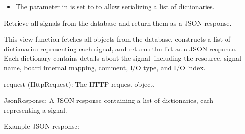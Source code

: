 \documentclass[letterpaper,10pt,english]{sphinxmanual}
\begin{document}
\begin{fulllineitems}
\begin{description}
\begin{itemize}
\item {} 
\sphinxAtStartPar
The  parameter in  is set to  to allow serializing a list of dictionaries.

\end{itemize}

\end{description}

\end{fulllineitems}


\begin{fulllineitems}
\label{\detokenize{app:app.views.get_signals}}
\pysigstartsignatures
{}
\pysigstopsignatures
\sphinxAtStartPar
Retrieve all signals from the database and return them as a JSON response.

\sphinxAtStartPar
This view function fetches all  objects from the database, 
constructs a list of dictionaries representing each signal, and returns the list 
as a JSON response. Each dictionary contains details about the signal, including 
the resource, signal name, board internal mapping, comment, I/O type, and I/O index.
\begin{description}
\sphinxAtStartPar
request (HttpRequest): The HTTP request object.

\sphinxAtStartPar
JsonResponse: A JSON response containing a list of dictionaries, each representing a signal.

\sphinxAtStartPar
Example JSON response:


\end{description}
\end{fulllineitems}
\end{document}

